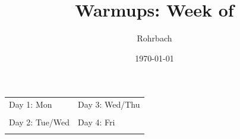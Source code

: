 \documentclass[10pt]{exam}
\title{Warmups: Week of \fillin[][10em]}
\author{Rohrbach}
\date{\today}
\begin{document}
\maketitle

\vfill

\noindent
\begin{tabularx}{\textwidth}{X|X}
  \sc Day 1: Mon & \sc Day 3: Wed/Thu \\
  &\\[3.8in] \hline
  \sc Day 2: Tue/Wed & \sc Day 4: Fri \\
  &\\[3.8in] 
\end{tabularx}
\end{document}
